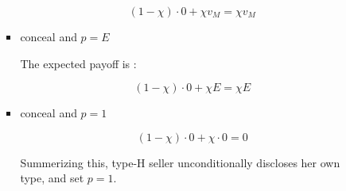 \documentclass{jsarticle}
\begin{document}
\begin{enumerate}
\begin{enumerate}
\begin{itemize}
  \[ (1- \chi) \cdot 0 + \chi v_M = \chi v_M \]
  
  \item conceal and $p = E$
  
  The expected payoff is :
  
  \[ (1 - \chi) \cdot 0 + \chi E = \chi E \]
  
  \item conceal and $p = 1$
  
  \[ (1 - \chi) \cdot 0 + \chi \cdot 0 = 0 \]
  
  Summerizing this, type-H seller unconditionally discloses her own type, and set $p = 1$.
  
  \end{itemize}
 
 \end{enumerate}

\end{enumerate}
\end{document}
